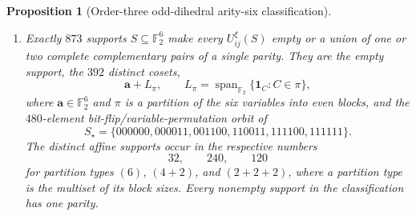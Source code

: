 \documentclass[11pt,letterpaper,onecolumn]{article}
\theoremstyle{plain}
\newtheorem{proposition}[proposition]{Proposition}
\theoremstyle{definition}
\theoremstyle{remark}
\newcommand{\Ftwo}{\mathbb F_2}
\newcommand{\Span}{\operatorname{span}}
\newcommand{\one}{\mathbf 1}
\begin{document}
\begin{proposition}[Order-three odd-dihedral arity-six classification]
\begin{enumerate}[label=\textnormal{(\roman*)},leftmargin=*]
			\item Exactly \(873\) supports \(S\subseteq\Ftwo^6\) make every
			\(U_{ij}^{\xi}(S)\) empty or a union of one or two complete complementary pairs of a single parity.  They are the empty support, the \(392\)
			distinct cosets,
			\[
			{\mathbf a}+L_\pi,
			\qquad
			L_\pi=\Span_{\Ftwo}\{\one_C:C\in\pi\},
			\]
			where \({\mathbf a}\in\Ftwo^6\) and \(\pi\) is a partition of the six variables into even
			blocks, and the
			\(480\)-element bit-flip/variable-permutation orbit of
			\begin{equation*}
				S_\star=
				\{000000,000011,001100,110011,111100,111111\}.
			\end{equation*}
			The distinct affine supports occur in the respective numbers
			\[
			32,\qquad240,\qquad120
			\]
			for partition types \((6)\), \((4+2)\), and \((2+2+2)\), where a partition
			type is the multiset of its block sizes.  Every nonempty
			support in the classification has one parity.
		\end{enumerate}
	\end{proposition}
	
\end{document}

